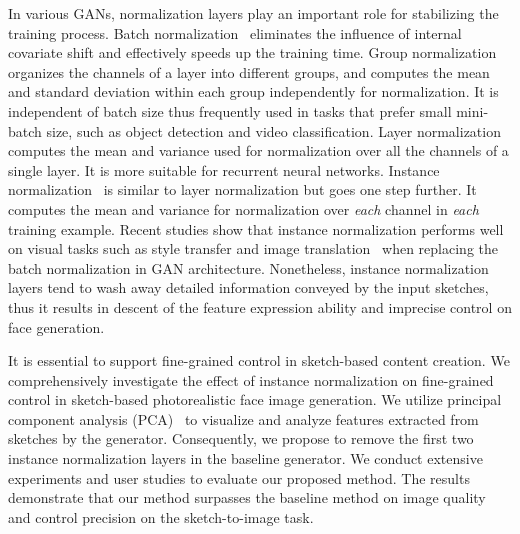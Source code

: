 \documentclass{article}
\begin{document}
In various GANs, normalization layers play an important role for stabilizing the training process. 
Batch normalization~\cite{bn} eliminates the influence of internal covariate shift and effectively speeds up the training time. 
Group normalization~\cite{gn} organizes the channels of a layer into different groups, and computes the mean and standard deviation within each group independently for normalization. It is independent of batch size thus frequently used in tasks that prefer small mini-batch size, such as object detection and video classification.
Layer normalization~\cite{ln} computes the mean and variance used for normalization over all the channels of a single layer. It is more suitable for recurrent neural networks. 
Instance normalization~\cite{instance_norm} is similar to layer normalization but goes one step further. It computes the mean and variance for normalization over \emph{each} channel in \emph{each} training example.
Recent studies show that instance normalization performs well on visual tasks such as style transfer and image translation~\cite{pix2pixhd,spade,cyclegan} when replacing the batch normalization in GAN architecture. 
Nonetheless, instance normalization layers tend to wash away detailed information conveyed by the input sketches, thus it results in descent of the feature expression ability and imprecise control on face generation. 
 
It is essential to support fine-grained control in sketch-based content creation. 
We comprehensively investigate the effect of instance normalization on fine-grained control in sketch-based photorealistic face image generation. 
We utilize principal component analysis (PCA)~\cite{pca} to visualize and analyze features extracted from sketches by the generator. 
Consequently, we propose to remove the first two instance normalization layers in the baseline generator.
We conduct extensive experiments and user studies to evaluate our proposed method. The results demonstrate that our method surpasses the baseline method on image quality and control precision on the sketch-to-image task.








\end{document}
